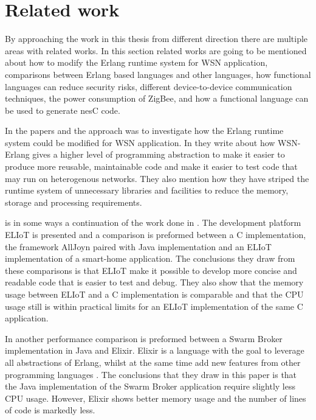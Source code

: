 \chapter{Related work}
By approaching the work in this thesis from different direction there are multiple areas with related works. In this section related works are going to be mentioned about how to modify the Erlang runtime system for WSN application, comparisons between Erlang based languages and other languages, how functional languages can reduce security risks, different device-to-device communication techniques, the power consumption of ZigBee, and how a functional language can be used to generate nesC code. 

In the papers \citet{sivieri2012wsn} and \citet{sivieri2016building} the approach was to investigate how the Erlang runtime system could be modified for WSN application. In \citet{sivieri2012wsn} they write about how WSN-Erlang gives a higher level of programming abstraction to make it easier to produce more reusable, maintainable code and make it easier to test code that may run on heterogenous networks. They also mention how they have striped the runtime system of unnecessary libraries and facilities to reduce the memory, storage and processing requirements. 

\citet{sivieri2016building} is in some ways a continuation of the work done in \citet{sivieri2012wsn}. The development platform ELIoT is presented and a comparison is preformed between a C implementation, the framework AllJoyn paired with Java implementation and an ELIoT implementation of a smart-home application. The conclusions they draw from these comparisons is that ELIoT make it possible to develop more concise and readable code that is easier to test and debug. They also show that the memory usage between ELIoT and a C implementation is comparable and that the CPU usage still is within practical limits for an ELIoT implementation of the same C application. 

In \citet{fedrecheski2016elixir} another performance comparison is preformed between a Swarm Broker implementation in Java and Elixir. Elixir is a language with the goal to leverage all abstractions of Erlang, whilst at the same time add new features from other programming languages \citep{thomas2018programming}. The conclusions that they draw in this paper is that the Java implementation of the Swarm Broker application require slightly less CPU usage. However, Elixir shows better memory usage and the number of lines of code is markedly less. 


